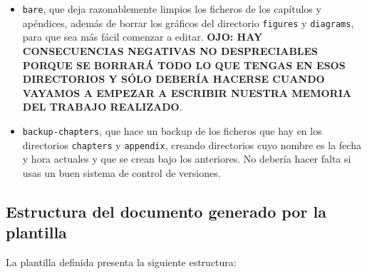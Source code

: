 \begin{itemize}
\begin{itemize}
  \item \texttt{bare}, que deja razonablemente limpios los ficheros de
    los capítulos y apéndices, además de borrar los gráficos del
    directorio \texttt{figures} y \texttt{diagrams}, para que sea más
    fácil comenzar a editar. \textbf{OJO: HAY CONSECUENCIAS NEGATIVAS NO
      DESPRECIABLES PORQUE SE BORRARÁ TODO LO QUE TENGAS EN ESOS
      DIRECTORIOS Y SÓLO DEBERÍA HACERSE CUANDO VAYAMOS A EMPEZAR A
      ESCRIBIR NUESTRA MEMORIA DEL TRABAJO REALIZADO}.

  \item \texttt{backup-chapters}, que hace un backup de los ficheros que
    hay en los directorios \texttt{chapters} y \texttt{appendix},
    creando directorios cuyo nombre es la fecha y hora actuales y que se
    crean bajo los anteriores. No debería hacer falta si usas un buen
    sistema de control de versiones.
  \end{itemize}

\end{itemize}



\subsection{Estructura del documento generado por la plantilla}
\label{sec:estr-del-docum}

La plantilla definida presenta la siguiente estructura:

